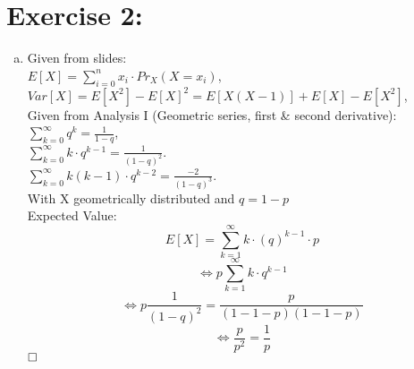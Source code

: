 \documentclass[a4paper]{article}
\begin{document}
	\section*{Exercise 2: }\label{sec:exercise2}
        \begin{enumerate}[a.]
            \item Given from slides: \\
                 $E[X] = \sum_{i=0}^{n}x_i \cdot Pr_X(X=x_i)$, \\
                 $Var[X] = E[X^2] - E[X]^2 = E[X(X-1)] + E[X] - E[X^2]$, \\
                 Given from Analysis I (Geometric series, first \& second derivative): \\
                 $\sum_{k=0}^{\infty} q^k = \frac{1}{1-q}$, \\
                 $\sum_{k=0}^{\infty} k \cdot q^{k-1} = \frac{1}{(1-q)^2}$. \\
                 $\sum_{k=0}^{\infty} k(k - 1) \cdot q^{k-2} = \frac{-2}{(1-q)^3}$. \\
                
                With X geometrically distributed and $q = 1-p$ \\
                Expected Value:
                \[ E[X] = \sum_{k=1}^{\infty} k \cdot (q)^{k-1} \cdot p  \]
                \[ \Leftrightarrow p \sum_{k=1}^{\infty} k \cdot q^{k-1} \]
                \[ \Leftrightarrow p \frac{1}{(1-q)^2} = \frac{p}{(1-1-p)(1-1-p)} \]
                \[ \Leftrightarrow \frac{p}{p^2} = \frac{1}{p}  \] $\hfill \square$ \\
                \newpage
                

\end{enumerate}
\end{document}
